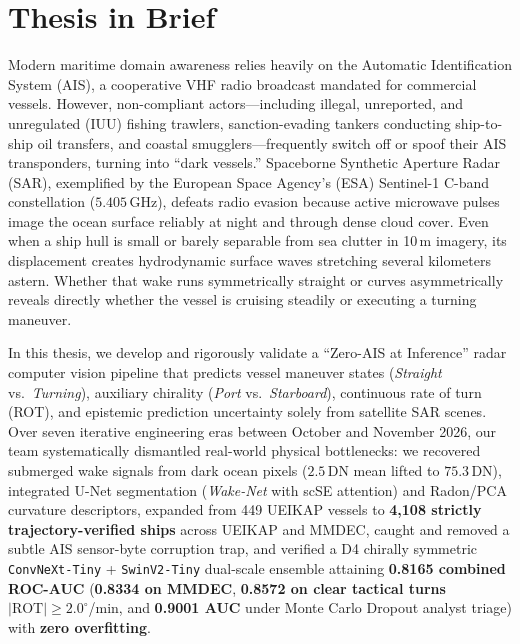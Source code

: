 \documentclass[11pt,a4paper]{article}
\begin{document}
\tableofcontents
\newpage
\listoffigures
\listoftables
\newpage

\setcounter{page}{1}

\section{Thesis in Brief}

Modern maritime domain awareness relies heavily on the Automatic Identification System (AIS), a cooperative VHF radio broadcast mandated for commercial vessels. However, non-compliant actors---including illegal, unreported, and unregulated (IUU) fishing trawlers, sanction-evading tankers conducting ship-to-ship oil transfers, and coastal smugglers---frequently switch off or spoof their AIS transponders, turning into ``dark vessels.'' Spaceborne Synthetic Aperture Radar (SAR), exemplified by the European Space Agency's (ESA) Sentinel-1 C-band constellation ($5.405$\,GHz), defeats radio evasion because active microwave pulses image the ocean surface reliably at night and through dense cloud cover. Even when a ship hull is small or barely separable from sea clutter in 10\,m imagery, its displacement creates hydrodynamic surface waves stretching several kilometers astern. Whether that wake runs symmetrically straight or curves asymmetrically reveals directly whether the vessel is cruising steadily or executing a turning maneuver.

In this thesis, we develop and rigorously validate a ``Zero-AIS at Inference'' radar computer vision pipeline that predicts vessel maneuver states (\textit{Straight} vs.\ \textit{Turning}), auxiliary chirality (\textit{Port} vs.\ \textit{Starboard}), continuous rate of turn (ROT), and epistemic prediction uncertainty solely from satellite SAR scenes. Over seven iterative engineering eras between October and November 2026, our team systematically dismantled real-world physical bottlenecks: we recovered submerged wake signals from dark ocean pixels ($2.5$\,DN mean lifted to $75.3$\,DN), integrated U-Net segmentation (\textit{Wake-Net} with scSE attention) and Radon/PCA curvature descriptors, expanded from 449 UEIKAP vessels to \textbf{4,108 strictly trajectory-verified ships} across UEIKAP and MMDEC, caught and removed a subtle AIS sensor-byte corruption trap, and verified a D4 chirally symmetric \texttt{ConvNeXt-Tiny} + \texttt{SwinV2-Tiny} dual-scale ensemble attaining \textbf{0.8165 combined ROC-AUC} (\textbf{0.8334 on MMDEC}, \textbf{0.8572 on clear tactical turns} $|\text{ROT}|\ge 2.0^\circ$/min, and \textbf{0.9001 AUC} under Monte Carlo Dropout analyst triage) with \textbf{zero overfitting}.
\end{document}
